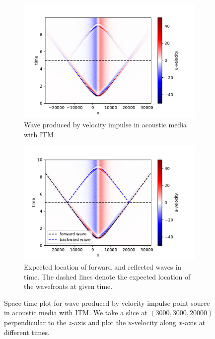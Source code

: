 \begin{figure}[htpb]
\begin{subfigure}[t]{0.49\textwidth}   
    \centering 
    \includegraphics[width=\textwidth]{figures/AcousticITM.pdf}
    \caption{Wave produced by velocity impulse in acoustic media with \ac{ITM}}
\end{subfigure}
\hfill
\begin{subfigure}[t]{0.49\textwidth}
    \centering 
    \includegraphics[width=\textwidth]{figures/AcousticITMAnnotated.pdf}
    \caption{Expected location of forward and reflected waves in time. The dashed lines denote the expected location of the wavefronts at given time.}
    \label{subfig:acousticITMAnnotated}
\end{subfigure}
\caption{Space-time plot for wave produced by velocity impulse point source in acoustic media with \ac{ITM}. We take a slice at $\left(3000,3000,20000\right)$ perpendicular to the $z$-axis
and plot the $u$-velocity along $x$-axis at different times.}
\label{fig:space-timeplot-acousticITM}
\end{figure}

